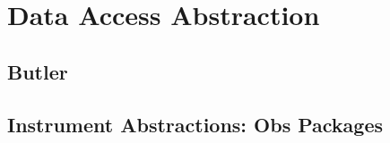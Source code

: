 \section{Data Access Abstraction}

\subsection{Butler}

\subsection{Instrument Abstractions: Obs Packages}
